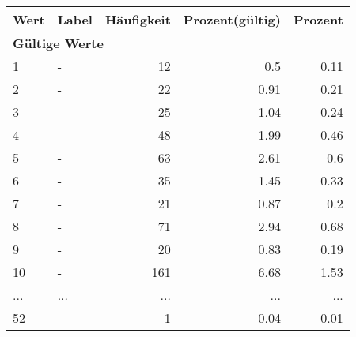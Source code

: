      \begin{longtable}{lXrrr}
     \toprule
     \textbf{Wert} & \textbf{Label} & \textbf{Häufigkeit} & \textbf{Prozent(gültig)} & \textbf{Prozent} \\
     \endhead
     \midrule
     \multicolumn{5}{l}{\textbf{Gültige Werte}}\\
        1 & \multicolumn{1}{X}{-} & %
          \num{12} &
          \num[round-mode=places,round-precision=2]{0,5} &
          \num[round-mode=places,round-precision=2]{0,11} \\
        2 & \multicolumn{1}{X}{-} & %
          \num{22} &
          \num[round-mode=places,round-precision=2]{0,91} &
          \num[round-mode=places,round-precision=2]{0,21} \\
        3 & \multicolumn{1}{X}{-} & %
          \num{25} &
          \num[round-mode=places,round-precision=2]{1,04} &
          \num[round-mode=places,round-precision=2]{0,24} \\
        4 & \multicolumn{1}{X}{-} & %
          \num{48} &
          \num[round-mode=places,round-precision=2]{1,99} &
          \num[round-mode=places,round-precision=2]{0,46} \\
        5 & \multicolumn{1}{X}{-} & %
          \num{63} &
          \num[round-mode=places,round-precision=2]{2,61} &
          \num[round-mode=places,round-precision=2]{0,6} \\
        6 & \multicolumn{1}{X}{-} & %
          \num{35} &
          \num[round-mode=places,round-precision=2]{1,45} &
          \num[round-mode=places,round-precision=2]{0,33} \\
        7 & \multicolumn{1}{X}{-} & %
          \num{21} &
          \num[round-mode=places,round-precision=2]{0,87} &
          \num[round-mode=places,round-precision=2]{0,2} \\
        8 & \multicolumn{1}{X}{-} & %
          \num{71} &
          \num[round-mode=places,round-precision=2]{2,94} &
          \num[round-mode=places,round-precision=2]{0,68} \\
        9 & \multicolumn{1}{X}{-} & %
          \num{20} &
          \num[round-mode=places,round-precision=2]{0,83} &
          \num[round-mode=places,round-precision=2]{0,19} \\
        10 & \multicolumn{1}{X}{-} & %
          \num{161} &
          \num[round-mode=places,round-precision=2]{6,68} &
          \num[round-mode=places,round-precision=2]{1,53} \\
       ... & ... & ... & ... & ... \\
        52 & \multicolumn{1}{X}{-} & %
          \num{1} &
          \num[round-mode=places,round-precision=2]{0,04} &
          \num[round-mode=places,round-precision=2]{0,01} \\


\end{longtable}
